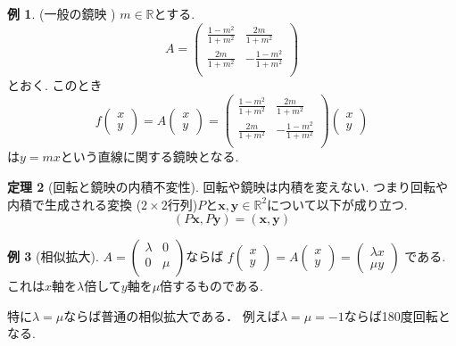 \documentclass[dvipdfmx,a4paper,11pt]{article}
\newcommand{\R}{\mathbb{R}}
\theoremstyle{definition}
\newtheorem{thm}{定理}
\newtheorem{exa}[thm]{例}
\begin{document}
 \begin{exa}(一般の鏡映 \cite[例題1.4]{M})
$m \in \R$とする.
$$A=\begin{pmatrix}
\frac{1-m^2}{1+m^2}& \frac{2m}{1+m^2} \\
\frac{2m}{1+m^2}  & -\frac{1-m^2}{1+m^2} \\
\end{pmatrix}
$$
とおく. 
このとき
$$
f\begin{pmatrix}
x \\ y
 \end{pmatrix} 
 =
 A
\begin{pmatrix}
x \\ y
 \end{pmatrix}  
 =
\begin{pmatrix}
\frac{1-m^2}{1+m^2}& \frac{2m}{1+m^2} \\
\frac{2m}{1+m^2}  & -\frac{1-m^2}{1+m^2} \\
\end{pmatrix} 
\begin{pmatrix}
x \\ y
 \end{pmatrix}  
$$
は$y=mx$という直線に関する鏡映となる. 
\end{exa}

 \begin{tcolorbox}[
    colback = white,
    colframe = green!35!black,
    fonttitle = \bfseries,
    breakable = true]
    \begin{thm}[回転と鏡映の内積不変性]
    回転や鏡映は内積を変えない. つまり回転や内積で生成される変換
    ($2 \times 2$行列)$P$と$\bm{x}, \bm{y} \in \R^2$について以下が成り立つ. 
    $$
    (P\bm{x}, P\bm{y}) = (\bm{x}, \bm{y})
    $$
    \end{thm}
   
    \end{tcolorbox}

 \begin{exa}[相似拡大]
$
A=\begin{pmatrix}
\lambda& 0 \\
0& \mu \\
\end{pmatrix}
$ならば
$
f\begin{pmatrix}
x \\ y
 \end{pmatrix} 
 =
 A
\begin{pmatrix}
x \\ y
 \end{pmatrix}  = 
 \begin{pmatrix}
\lambda x \\\mu y
 \end{pmatrix}
$
である.
これは$x$軸を$\lambda$倍して$y$軸を$\mu$倍するものである.

特に$\lambda=\mu$ならば普通の相似拡大である．
例えば$\lambda=\mu=-1$ならば180度回転となる. 
\end{exa}
\end{document}
